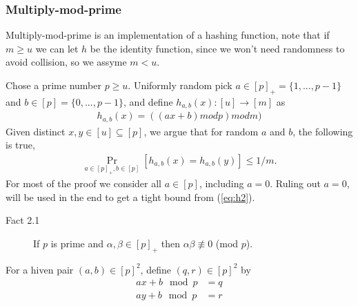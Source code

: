 \subsubsection{Multiply-mod-prime}
Multiply-mod-prime is an implementation of a hashing function, note that if $m
\geq u$ we can let $h$ be the identity function, since we won't need randomness
to avoid collision, so we assyme $m < u$.

Chose a prime number $p \geq u$. Uniformly random pick $a \in [p]_+ = \{1, ...,
p-1\}$ and $b \in [p] = \{ 0, ..., p-1\}$, and define $h_{a,b}(x) : [u]
\rightarrow [m]$ as
\begin{align}
  h_{a,b}(x) = ((ax+b) mod p) mod m) \label{eq:h1}
\end{align}
Given distinct $x,y \in [u] \subseteq [p]$, we argue that for random $a$ and
$b$, the following is true,
\begin{align}
  \underset{a\in [p]_+,b\in [p]}{\Pr}[h_{a,b}(x) = h_{a,b}(y)] \leq
  1/m. \label{eq:h2}
\end{align}
For most of the proof we consider all $a \in [p]$, including $a=0$. Ruling out
$a=0$, will be used in the end to get a tight bound from (\ref{eq:h2}).

\begin{description}
\item[Fact 2.1] If $p$ is prime and $\alpha, \beta \in [p]_+$ then $\alpha \beta
  \not\equiv 0$ (mod $p$).
\end{description}

For a hiven pair $(a,b) \in [p]^2$, define $(q,r) \in [p]^2$ by
\begin{align}
  ax+b\mod p &= q \label{eq:h3} \\
  ay+b\mod p &= r \label{eq:h4}
\end{align}

